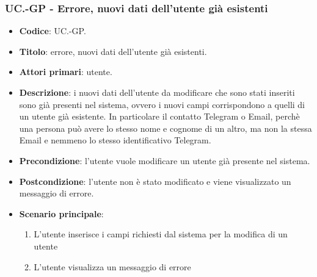 		\subsubsection{UC\theuccount.\thesubuccount-GP - Errore, nuovi dati dell'utente già esistenti}

		\begin{itemize}
			\item \textbf{Codice}: UC\theuccount.\thesubuccount-GP.
			\item \textbf{Titolo}: errore, nuovi dati dell'utente già esistenti.
			\item \textbf{Attori primari}: utente.
			\item \textbf{Descrizione}: i nuovi dati dell'utente da modificare che sono stati inseriti sono già presenti nel sistema, ovvero i nuovi campi corrispondono a quelli di un utente già esistente. In particolare il contatto Telegram o Email, perchè una persona può avere lo stesso nome e cognome di un altro, ma non la stessa Email e nemmeno lo stesso identificativo Telegram.
			\item \textbf{Precondizione}: l'utente vuole modificare un utente già presente nel sistema.
			\item \textbf{Postcondizione}: l'utente non è stato modificato e viene visualizzato un messaggio di errore.
			\item \textbf{Scenario principale}:
			\begin{enumerate}
				\item L'utente inserisce i campi richiesti dal sistema per la modifica di un utente
				\item L'utente visualizza un messaggio di errore
			\end{enumerate}
		\end{itemize}

